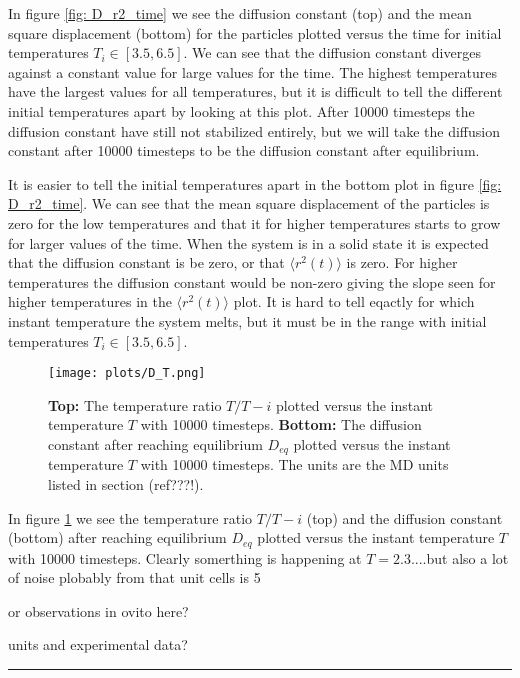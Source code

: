\documentclass[11pt,a4wide]{article}
\begin{document}
In figure \ref{fig: D_r2_time} we see the diffusion constant (top) and the mean square displacement (bottom) for the particles plotted versus the time for initial temperatures $T_i \in [3.5, 6.5]$. We can see that the diffusion constant diverges against a constant value for large values for the time. The highest temperatures have the largest values for all temperatures, but it is difficult to tell the different initial temperatures apart by looking at this plot. After 10000 timesteps the diffusion constant have still not stabilized entirely, but we will take the diffusion constant after 10000 timesteps to be the diffusion constant after equilibrium. 

It is easier to tell the initial temperatures apart in the bottom plot in figure \ref{fig: D_r2_time}. We can see that the mean square displacement of the particles is zero for the low temperatures and that it for higher temperatures starts to grow for larger values of the time. When the system is in a solid state it is expected that the diffusion constant is be zero, or that $\langle r^2(t) \rangle$ is zero. For higher temperatures the diffusion constant would be non-zero giving the slope seen for higher temperatures in the $\langle r^2(t) \rangle$ plot. It is hard to tell eqactly for which instant temperature the system melts, but it must be in the range with initial temperatures $T_i \in [3.5, 6.5]$.

\begin{figure}[htp]
\centering
\texttt{[image: plots/D\_T.png]}
\caption{\textbf{Top:} The temperature ratio $T/T-i$ plotted versus the instant temperature $T$ with 10000 timesteps. \textbf{Bottom:} The diffusion constant after reaching equilibrium $D_{eq}$ plotted versus the instant temperature $T$ with 10000 timesteps. The units are the MD units listed in section (ref???!).}
\label{fig: D_T}
\end{figure}

In figure \ref{fig: D_T} we see the temperature ratio $T/T-i$ (top) and the diffusion constant (bottom) after reaching equilibrium $D_{eq}$ plotted versus the instant temperature $T$ with 10000 timesteps. Clearly somerthing is happening at $T=2.3$....but also a lot of noise plobably from that unit cells is 5



or observations in ovito here?


units and experimental data?

\centering
\rule{0.3\textwidth}{0.4pt}\par %
\end{document}
